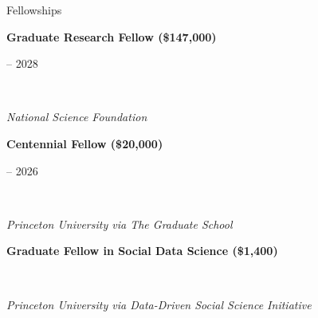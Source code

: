 \documentclass{cv} %
\begin{document}

\begin{cvSection}{Fellowships}

  \begin{minipage}[t]{0.50\linewidth}
    \raggedright \textbf{Graduate Research Fellow (\$147,000)}%
  \end{minipage}
  \hfill
  \begin{minipage}[t]{0.45\linewidth}
     -- 2028%
  \end{minipage}
  \\
  \begin{minipage}[t]{0.70\linewidth}
    \raggedright \textit{National Science Foundation}%
  \end{minipage}
  \hfill
  \begin{minipage}[t]{0.25\linewidth}
  \end{minipage}

  \begin{minipage}[t]{0.70\linewidth}
    \raggedright \textbf{Centennial Fellow (\$20,000)}%
  \end{minipage}
  \hfill
  \begin{minipage}[t]{0.25\linewidth}
     -- 2026%
  \end{minipage}
  \\
  \begin{minipage}[t]{0.70\linewidth}
    \raggedright \textit{Princeton University via The Graduate School}%
  \end{minipage}
  \hfill
  \begin{minipage}[t]{0.25\linewidth}
  \end{minipage}

  \begin{minipage}[t]{0.70\linewidth}
    \raggedright \textbf{Graduate Fellow in Social Data Science (\$1,400)}%
  \end{minipage}
  \hfill
  \begin{minipage}[t]{0.25\linewidth}
  \end{minipage}
  \\
  \begin{minipage}[t]{0.70\linewidth}
    \raggedright \textit{Princeton University via Data-Driven Social Science Initiative}%
  \end{minipage}
  \hfill
  \begin{minipage}[t]{0.25\linewidth}
  \end{minipage}

\end{cvSection}
\end{document}
